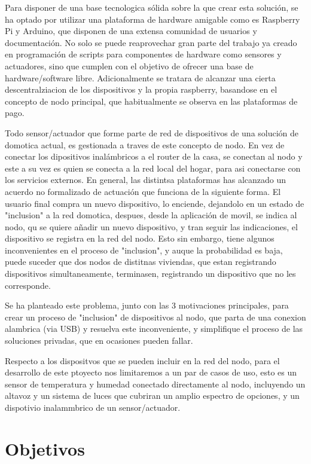 Para disponer de una base tecnologica sólida sobre la que crear esta solución, se ha optado por utilizar una plataforma de hardware amigable como es Raspberry Pi y Arduino, que disponen de una extensa comunidad de usuarios y documentación. No solo se puede reaprovechar gran parte del trabajo ya creado en programación de scripts para componentes de hardware como sensores  y actuadores, sino que cumplen con el objetivo de ofrecer una base de hardware/software libre. Adicionalmente se tratara de alcanzar una cierta descentralziacion de los dispositivos y la propia raspberry, basandose en el concepto de nodo principal, que habitualmente se observa en las plataformas de pago.

Todo sensor/actuador que forme parte de red de dispositivos de una solución de domotica actual, es gestionada a traves de este concepto de nodo. En vez de conectar los dipositivos inalámbricos a el router de la casa, se conectan al nodo y este a su vez es quien se conecta a la red local del hogar, para asi conectarse con los servicios externos. En general, las distintsa plataformas  has alcanzado un acuerdo no formalizado de actuación que funciona  de la siguiente forma. El usuario final compra un nuevo dispositivo, lo enciende, dejandolo en un estado de "inclusion" a la red domotica, despues, desde la aplicación de movil, se indica al nodo, qu se quiere añadir un nuevo dispositivo, y tran seguir las indicaciones, el dispositivo se registra en la red del nodo. Esto sin embargo, tiene algunos inconvenientes en el proceso de "inclusion", y auque la probabilidad es baja, puede suceder que dos nodos de distitnas viviendas, que estan registrando dispositivos simultaneamente, terminasen, registrando un dispositivo que no les corresponde.

Se ha planteado este problema, junto con las 3 motivaciones principales, para crear un proceso de "inclusion" de dispositivos al nodo, que parta de una conexion alambrica (via USB) y resuelva este inconveniente, y simplifique el proceso de las soluciones privadas, que en ocasiones pueden fallar.

Respecto a los dispositvos que se pueden incluir en la red del nodo, para el desarrollo de este ptoyecto nos limitaremos a un par de casos de uso, esto es un sensor de temperatura y humedad conectado directamente al nodo, incluyendo un altavoz y un sistema de luces que cubriran un amplio espectro de opciones, y un dispotivio inalammbrico de un sensor/actuador.



\section{Objetivos}
\label{ch:Capitulo1.2}


